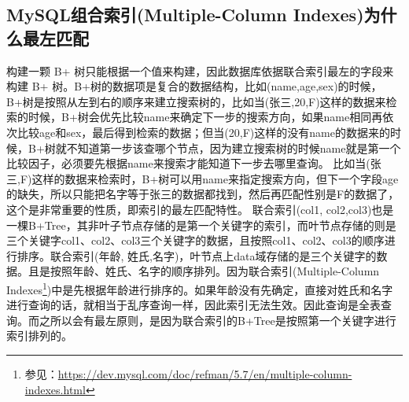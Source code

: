 \documentclass[../../../interview-questions.tex]{subfiles}
\begin{document}
\subsection{MySQL组合索引(Multiple-Column Indexes)为什么最左匹配}

构建一颗 B+ 树只能根据一个值来构建，因此数据库依据联合索引最左的字段来构建 B+ 树。B+树的数据项是复合的数据结构，比如(name,age,sex)的时候，B+树是按照从左到右的顺序来建立搜索树的，比如当(张三,20,F)这样的数据来检索的时候，B+树会优先比较name来确定下一步的搜索方向，如果name相同再依次比较age和sex，最后得到检索的数据；但当(20,F)这样的没有name的数据来的时候，B+树就不知道第一步该查哪个节点，因为建立搜索树的时候name就是第一个比较因子，必须要先根据name来搜索才能知道下一步去哪里查询。
比如当(张三,F)这样的数据来检索时，B+树可以用name来指定搜索方向，但下一个字段age的缺失，所以只能把名字等于张三的数据都找到，然后再匹配性别是F的数据了， 这个是非常重要的性质，即索引的最左匹配特性。
联合索引(col1, col2,col3)也是一棵B+Tree，其非叶子节点存储的是第一个关键字的索引，而叶节点存储的则是三个关键字col1、col2、col3三个关键字的数据，且按照col1、col2、col3的顺序进行排序。联合索引(年龄, 姓氏,名字)，叶节点上data域存储的是三个关键字的数据。且是按照年龄、姓氏、名字的顺序排列。因为联合索引(Multiple-Column Indexes\footnote{参见：\url{https://dev.mysql.com/doc/refman/5.7/en/multiple-column-indexes.html}})中是先根据年龄进行排序的。如果年龄没有先确定，直接对姓氏和名字进行查询的话，就相当于乱序查询一样，因此索引无法生效。因此查询是全表查询。而之所以会有最左原则，是因为联合索引的B+Tree是按照第一个关键字进行索引排列的。
\end{document}
